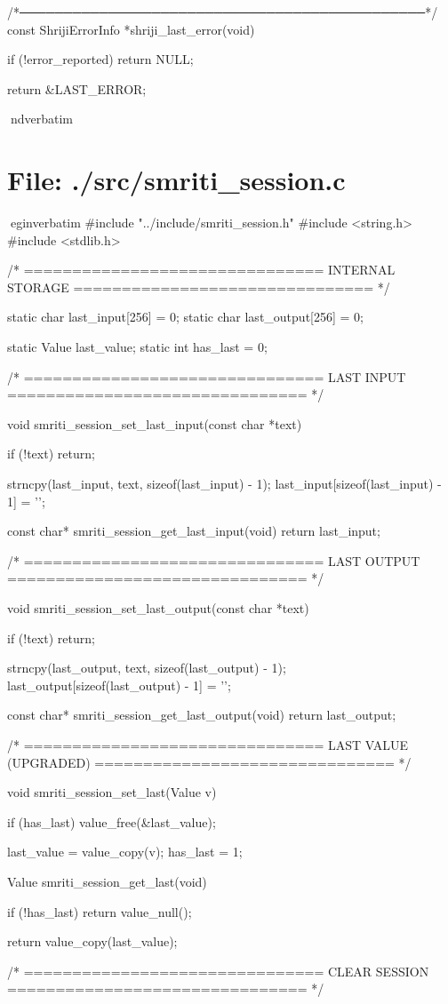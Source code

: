 \documentclass{article}
\begin{document}
/*──────────────────────────────────────────────*/
const ShrijiErrorInfo *shriji_last_error(void)
{
    if (!error_reported)
        return NULL;

    return &LAST_ERROR;
}
nd{verbatim}
\section*{File: ./src/smriti_session.c}
egin{verbatim}
#include "../include/smriti_session.h"
#include <string.h>
#include <stdlib.h>

/* ===============================
   INTERNAL STORAGE
   =============================== */

static char last_input[256] = {0};
static char last_output[256] = {0};

static Value last_value;
static int has_last = 0;

/* ===============================
   LAST INPUT
   =============================== */

void smriti_session_set_last_input(const char *text)
{
    if (!text) return;

    strncpy(last_input, text, sizeof(last_input) - 1);
    last_input[sizeof(last_input) - 1] = '\0';
}

const char* smriti_session_get_last_input(void)
{
    return last_input;
}

/* ===============================
   LAST OUTPUT
   =============================== */

void smriti_session_set_last_output(const char *text)
{
    if (!text) return;

    strncpy(last_output, text, sizeof(last_output) - 1);
    last_output[sizeof(last_output) - 1] = '\0';
}

const char* smriti_session_get_last_output(void)
{
    return last_output;
}

/* ===============================
   LAST VALUE (UPGRADED)
   =============================== */

void smriti_session_set_last(Value v)
{
    if (has_last)
        value_free(&last_value);

    last_value = value_copy(v);
    has_last = 1;
}

Value smriti_session_get_last(void)
{
    if (!has_last)
        return value_null();

    return value_copy(last_value);
}

/* ===============================
   CLEAR SESSION
   =============================== */
\end{document}
